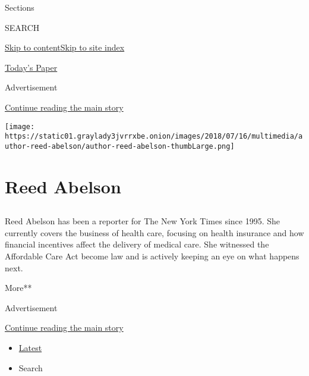 Sections

SEARCH

\protect\hyperlink{site-content}{Skip to
content}\protect\hyperlink{site-index}{Skip to site index}

\href{https://myaccount.nytimes3xbfgragh.onion/auth/login?response_type=cookie\&client_id=vi}{}

\href{https://www.nytimes3xbfgragh.onion/section/todayspaper}{Today's
Paper}

Advertisement

\protect\hyperlink{after-top}{Continue reading the main story}

\texttt{[image: https://static01.graylady3jvrrxbe.onion/images/2018/07/16/multimedia/author-reed-abelson/author-reed-abelson-thumbLarge.png]}

\hypertarget{reed-abelson}{%
\section{Reed Abelson}\label{reed-abelson}}

\subsection{}

Reed Abelson has been a reporter for The New York Times since 1995. She
currently covers the business of health care, focusing on health
insurance and how financial incentives affect the delivery of medical
care. She witnessed the Affordable Care Act become law and is actively
keeping an eye on what happens next.

More**

Advertisement

\protect\hyperlink{after-mid1}{Continue reading the main story}

\begin{itemize}
\tightlist
\item
  \protect\hyperlink{stream-panel}{Latest}
\item
  Search
\end{itemize}

